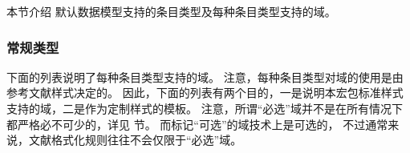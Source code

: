 
本节介绍 \biblatex 默认数据模型支持的条目类型及每种条目类型支持的域。
\subsubsection{常规类型}
\label{bib:typ:blx}




下面的列表说明了每种条目类型支持的域。
注意，每种条目类型对域的使用是由参考文献样式决定的。
因此，下面的列表有两个目的，一是说明本宏包标准样式支持的域，二是作为定制样式的模板。
注意，所谓“必选”域并不是在所有情况下都严格必不可少的，详见  节。
而标记“可选”的域技术上是可选的，
不过通常来说，文献格式化规则往往不会仅限于“必选”域。

